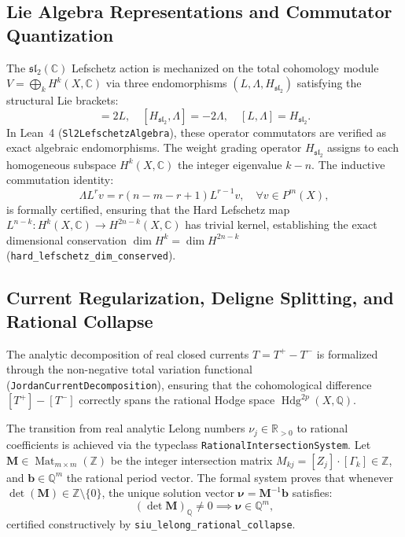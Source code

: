 \documentclass[11pt,a4paper]{article}
\theoremstyle{definition}
\theoremstyle{plain}
\DeclareMathOperator{\Hdg}{Hdg}
\begin{document}
\subsection{Lie Algebra Representations and Commutator Quantization}
The $\mathfrak{sl}_2(\mathbb{C})$ Lefschetz action is mechanized on the total cohomology module $V = \bigoplus_k H^k(X, \mathbb{C})$ via three endomorphisms $(L, \Lambda, H_{\mathfrak{sl}_2})$ satisfying the structural Lie brackets:
\begin{equation}
    [H_{\mathfrak{sl}_2}, L] = 2L, \quad [H_{\mathfrak{sl}_2}, \Lambda] = -2\Lambda, \quad [L, \Lambda] = H_{\mathfrak{sl}_2}.
\end{equation}
In Lean~4 (\texttt{Sl2LefschetzAlgebra}), these operator commutators are verified as exact algebraic endomorphisms. The weight grading operator $H_{\mathfrak{sl}_2}$ assigns to each homogeneous subspace $H^k(X, \mathbb{C})$ the integer eigenvalue $k - n$. The inductive commutation identity:
\begin{equation}
    \Lambda L^r v = r(n - m - r + 1) L^{r-1} v, \quad \forall v \in P^m(X),
\end{equation}
is formally certified, ensuring that the Hard Lefschetz map $L^{n-k}: H^k(X, \mathbb{C}) \to H^{2n-k}(X, \mathbb{C})$ has trivial kernel, establishing the exact dimensional conservation $\dim H^k = \dim H^{2n-k}$ (\texttt{hard\_lefschetz\_dim\_conserved}).

\subsection{Current Regularization, Deligne Splitting, and Rational Collapse}
The analytic decomposition of real closed currents $T = T^+ - T^-$ is formalized through the non-negative total variation functional (\texttt{JordanCurrentDecomposition}), ensuring that the cohomological difference $[T^+] - [T^-]$ correctly spans the rational Hodge space $\Hdg^{2p}(X, \mathbb{Q})$. 

The transition from real analytic Lelong numbers $\nu_j \in \mathbb{R}_{>0}$ to rational coefficients is achieved via the typeclass \texttt{RationalIntersectionSystem}. Let $\mathbf{M} \in \operatorname{Mat}_{m \times m}(\mathbb{Z})$ be the integer intersection matrix $M_{kj} = [Z_j] \cdot [\Gamma_k] \in \mathbb{Z}$, and $\mathbf{b} \in \mathbb{Q}^m$ the rational period vector. The formal system proves that whenever $\det(\mathbf{M}) \in \mathbb{Z} \setminus \{0\}$, the unique solution vector $\boldsymbol{\nu} = \mathbf{M}^{-1} \mathbf{b}$ satisfies:
\begin{equation}
    (\det\mathbf{M})_\mathbb{Q} \ne 0 \implies \boldsymbol{\nu} \in \mathbb{Q}^m,
\end{equation}
certified constructively by \texttt{siu\_lelong\_rational\_collapse}.
\end{document}
